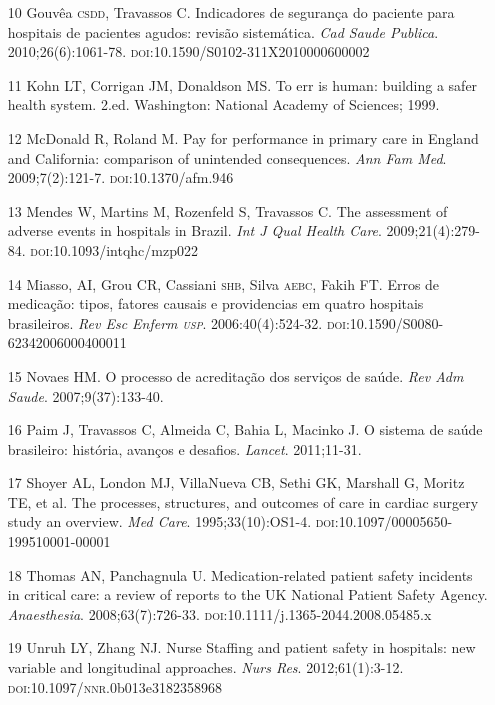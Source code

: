 \documentclass{article}
\begin{document}
\begin{itemize}
\item[10] Gouvêa \textsc{csdd}, Travassos C. Indicadores de segurança do paciente para
hospitais de pacientes agudos: revisão sistemática. \textit{Cad Saude Publica}.
2010;26(6):1061-78. \textsc{doi}:10.1590/S0102-311X2010000600002

\item[11] Kohn LT, Corrigan JM, Donaldson MS. To err is human: building a
safer
health system. 2.ed. Washington: National Academy of Sciences; 1999.

\item[12] McDonald R, Roland M. Pay for performance in primary care in England
and
California: comparison of unintended consequences. \textit{Ann Fam Med}.
2009;7(2):121-7. \textsc{doi}:10.1370/afm.946

\item[13] Mendes W, Martins M, Rozenfeld S, Travassos C. The assessment of
adverse
events in hospitals in Brazil. \textit{Int J Qual Health Care}.
2009;21(4):279-84. \textsc{doi}:10.1093/intqhc/mzp022

\item[14] Miasso, AI, Grou CR, Cassiani \textsc{shb}, Silva \textsc{aebc}, Fakih FT. Erros de
medicação: tipos, fatores causais e providencias em quatro hospitais
brasileiros.
\textit{Rev Esc Enferm \textsc{usp}}. 2006:40(4):524-32.
\textsc{doi}:10.1590/S0080-62342006000400011

\item[15] Novaes HM. O processo de acreditação dos serviços de saúde.
\textit{Rev
Adm Saude}. 2007;9(37):133-40.

\item[16] Paim J, Travassos C, Almeida C, Bahia L, Macinko J. O sistema de
saúde
brasileiro: história, avanços e desafios. \textit{Lancet}.
2011;11-31.

\item[17] Shoyer AL, London MJ, VillaNueva CB, Sethi GK, Marshall G, Moritz
TE, et
al. The processes, structures, and outcomes of care in cardiac surgery study an
overview.
\textit{Med Care}. 1995;33(10):OS1-4.
\textsc{doi}:10.1097/00005650-199510001-00001

\item[18] Thomas AN, Panchagnula U. Medication-related patient safety
incidents in
critical care: a review of reports to the UK National Patient Safety Agency.
\textit{Anaesthesia}. 2008;63(7):726-33.
\textsc{doi}:10.1111/j.1365-2044.2008.05485.x

\item[19] Unruh LY, Zhang NJ. Nurse Staffing and patient safety in hospitals:
new
variable and longitudinal approaches. \textit{Nurs Res}. 2012;61(1):3-12.
\textsc{doi}:10.1097/\textsc{nnr}.0b013e3182358968


\end{itemize}
\end{document}
